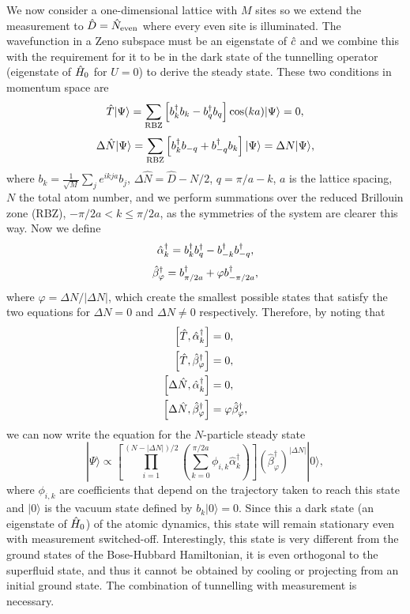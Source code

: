 We now consider a one-dimensional lattice with $M$ sites so we extend
the measurement to $\hat{D} = \hat{N}_\text{even}$ where every even site is
illuminated.  The wavefunction in a Zeno subspace must be an
eigenstate of $\hat{c}$ and we combine this with the requirement for it to
be in the dark state of the tunnelling operator (eigenstate of $\hat{H}_0$
for $U = 0$) to derive the steady state. These two conditions in
momentum space are
\begin{equation}
  \hat{T} | \Psi \rangle = \sum_{\text{RBZ}} \left[ b^\dagger_k b_k -
    b^\dagger_{q} b_{q} \right] \cos(ka) |\Psi \rangle = 0, \nonumber
\end{equation}
\begin{equation}
  \Delta \hat{N} |\Psi \rangle = \sum_{\text{RBZ}} \left[ b^\dagger_k b_{-q} +
    b^\dagger_{-q} b_k \right] | \Psi \rangle= \Delta N |\Psi \rangle, \nonumber
\end{equation}
where $b_k = \frac{1}{\sqrt{M}} \sum_j e^{i k j a} b_j$,
$\Delta \hat{N} = \hat{D} - N/2$, $q = \pi/a - k$, $a$ is the lattice
spacing, $N$ the total atom number, and we perform summations over the
reduced Brillouin zone (RBZ), $-\pi/2a < k \le \pi/2a$, as the
symmetries of the system are clearer this way. Now we define
\begin{equation}
\hat{\alpha}_k^\dagger = b^\dagger_k b^\dagger_q - b^\dagger_{-k} b^\dagger_{-q},
\end{equation}
\begin{equation}
\hat{\beta}_\varphi^\dagger = b^\dagger_{\pi/2a} + \varphi b^\dagger_{-\pi/2a},
\end{equation}
where $\varphi = \Delta N / | \Delta N |$, which create the smallest
possible states that satisfy the two equations for $\Delta N = 0$ and
$\Delta N \ne 0$ respectively. Therefore, by noting that
\begin{align}
  \left[ \hat{T}, \hat{\alpha}_k^\dagger \right] & = 0, \\
  \left[ \hat{T}, \hat{\beta}_\varphi^\dagger \right] & = 0, \\
  \left[ \Delta \hat{N}, \hat{\alpha}_k^\dagger \right] & = 0, \\
  \left[ \Delta \hat{N}, \hat{\beta}_\varphi^\dagger \right] & = \varphi
  \hat{\beta}_\varphi^\dagger,
\end{align}
we can now write the equation for the $N$-particle steady state
\begin{equation}
  \label{eq:ss}
  | \Psi \rangle \propto \left[ \prod_{i=1}^{(N - |\Delta N|)/2}
    \left( \sum_{k = 0}^{\pi/2a} \phi_{i,k} \hat{\alpha}_k^\dagger
    \right) \right] \left( \hat{\beta}_\varphi^\dagger \right)^{|
    \Delta N |} | 0 \rangle, \nonumber
\end{equation}
where $\phi_{i,k}$ are coefficients that depend on the trajectory
taken to reach this state and $|0 \rangle$ is the vacuum state defined
by $b_k |0 \rangle = 0$. Since this a dark state (an eigenstate of
$\hat{H}_0$) of the atomic dynamics, this state will remain stationary even
with measurement switched-off. Interestingly, this state is very
different from the ground states of the Bose-Hubbard Hamiltonian, it
is even orthogonal to the superfluid state, and thus it cannot be
obtained by cooling or projecting from an initial ground state. The
combination of tunnelling with measurement is necessary.

